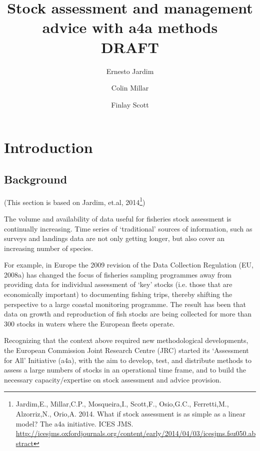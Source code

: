 \documentclass[a4paper,english,10pt]{article}\usepackage[]{graphicx}\usepackage[]{color}
\begin{document}

\title{Stock assessment and management advice with a4a methods \\ DRAFT}

\author[1]{Ernesto Jardim}
\author[1]{Colin Millar}
\author[1]{Finlay Scott}

\maketitle
\tableofcontents
\newpage

\section{Introduction}

\subsection{Background}

(This section is based on Jardim, et.al, 2014\footnote{Jardim,E., Millar,C.P., Mosqueira,I., Scott,F., Osio,G.C., Ferretti,M., Alzorriz,N., Orio,A. 2014. What if stock assessment is as simple as a linear model? The a4a initiative. ICES JMS. \url{http://icesjms.oxfordjournals.org/content/early/2014/04/03/icesjms.fsu050.abstract}
})

The volume and availability of data useful for fisheries stock assessment is continually increasing. Time series of ‘traditional’ sources of information, such as surveys and landings data are not only getting longer, but also cover an increasing number of species.

For example, in Europe the 2009 revision of the Data Collection Regulation (EU, 2008a) has changed the focus of fisheries sampling programmes away from providing data for individual assessment of ‘key’ stocks (i.e. those that are economically important) to documenting fishing trips, thereby shifting the perspective to a large coastal monitoring programme. The result has been that data on growth and reproduction of fish stocks are being collected for more than 300 stocks in waters where the European fleets operate.

Recognizing that the context above required new methodological developments, the European Commission Joint Research Centre (JRC) started its ‘Assessment for All’ Initiative (a4a), with the aim to develop, test, and distribute methods to assess a large numbers of stocks in an operational time frame, and to build the necessary capacity/expertise on stock assessment and advice provision. 
\end{document}
